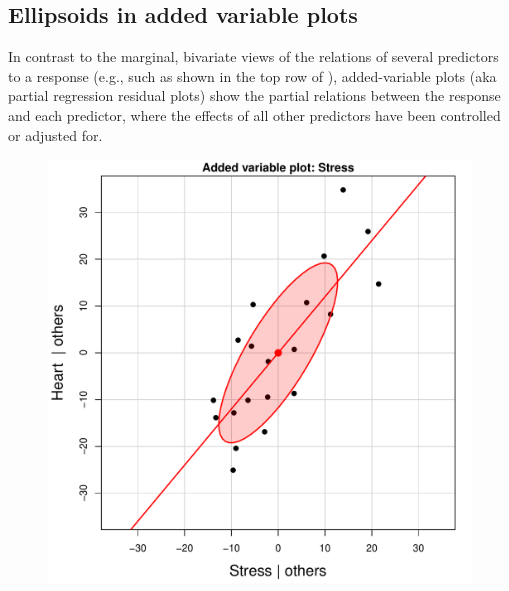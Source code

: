 \subsection{Ellipsoids in added variable plots}
In contrast to the marginal, bivariate views of the relations of several predictors to a
response (e.g., such as shown in the top row of ), added-variable plots
(aka partial regression residual plots) show the partial relations between the response and
each predictor, where the effects of all other predictors have been controlled or adjusted for.

\begin{figure}[htb]
 \begin{minipage}[b]{.49\linewidth}
  \centering
  \includegraphics[width=1\linewidth]{fig/coffee-avplot1}
 \end{minipage}%
 \hfill
 \begin{minipage}[b]{.49\linewidth}
  \centering

\end{minipage}
\end{figure}
